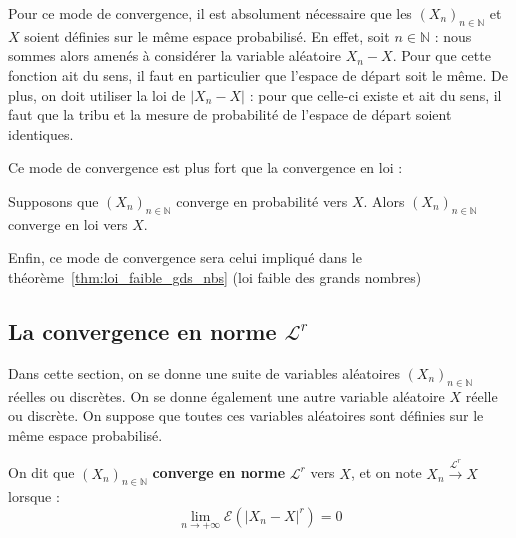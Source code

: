 \documentclass[../integ-proba.tex]{subfiles}
\begin{document}
    \begin{rem}
        Pour ce mode de convergence, il est absolument nécessaire que les $\left(X_n\right)_{n\in\mathbb{N}}$ et $X$ soient définies sur le même espace probabilisé.
        En effet, soit $n \in \mathbb{N}$ : nous sommes alors amenés à considérer la variable aléatoire $X_n - X$.
        Pour que cette fonction ait du sens, il faut en particulier que l'espace de départ soit le même.
        De plus, on doit utiliser la loi de $\left|X_n - X\right|$ : pour que celle-ci existe et ait du sens, il faut que la tribu et la mesure de probabilité de l'espace de départ soient identiques.
    \end{rem}

    Ce mode de convergence est plus fort que la convergence en loi :

    \begin{prop}
        Supposons que $\left(X_n\right)_{n\in\mathbb{N}}$ converge en probabilité vers $X$.
        Alors $\left(X_n\right)_{n\in\mathbb{N}}$ converge en loi vers $X$.
    \end{prop}

    \begin{rem}
        Enfin, ce mode de convergence sera celui impliqué dans le théorème~\ref{thm:loi_faible_gds_nbs} (loi faible des grands nombres)
    \end{rem}

    \subsection{La convergence en norme \texorpdfstring{$\mathcal{L}^r$}{Lr}}

    Dans cette section, on se donne une suite de variables aléatoires $\left(X_n\right)_{n\in\mathbb{N}}$ réelles ou discrètes.
    On se donne également une autre variable aléatoire $X$ réelle ou discrète.
    On suppose que toutes ces variables aléatoires sont définies sur le même espace probabilisé.

    \begin{defi}
        On dit que $\left(X_n\right)_{n\in\mathbb{N}}$ \textbf{converge en norme} $\mathcal{L}^r$ vers $X$, et on note $X_n \xrightarrow[]{\mathcal{L}^r} X$ lorsque :
        \begin{displaymath}
            \lim_{n \to +\infty}\mathcal{E}\left(\left|X_n - X\right|^r\right) = 0
        \end{displaymath}
    \end{defi}
\end{document}

